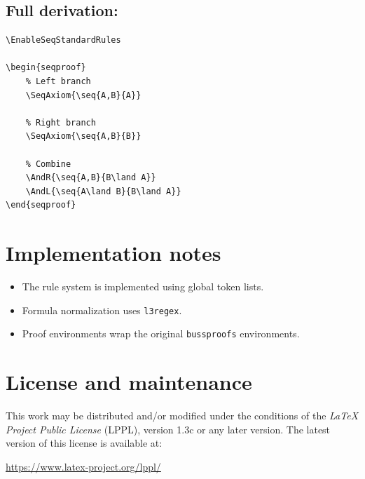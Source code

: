\documentclass[a4paper,1pt]{article}
\begin{document}
\subsection{Full derivation:}
\label{subsec:full_derivation}
\begin{tcolorbox}[seqexample,title={Derivation of $A \land B \Rightarrow B \land A$}]
\begin{lstlisting}
\EnableSeqStandardRules

\begin{seqproof}
    % Left branch
    \SeqAxiom{\seq{A,B}{A}}

    % Right branch
    \SeqAxiom{\seq{A,B}{B}}

    % Combine
    \AndR{\seq{A,B}{B\land A}}
    \AndL{\seq{A\land B}{B\land A}}
\end{seqproof}
\end{lstlisting}
\tcblower
\begin{seqproof}


\end{seqproof}
\end{tcolorbox}

\section{Implementation notes}

\begin{itemize}
    \item The rule system is implemented using global token lists.
    \item Formula normalization uses \texttt{l3regex}.
    \item Proof environments wrap the original \texttt{bussproofs} environments.
\end{itemize}

\section{License and maintenance}

This work may be distributed and/or modified under the conditions of
the \emph{\LaTeX{} Project Public License} (LPPL), version 1.3c or any
later version. The latest version of this license is available at:
\begin{center}
    \url{https://www.latex-project.org/lppl/}
\end{center}
\end{document}
